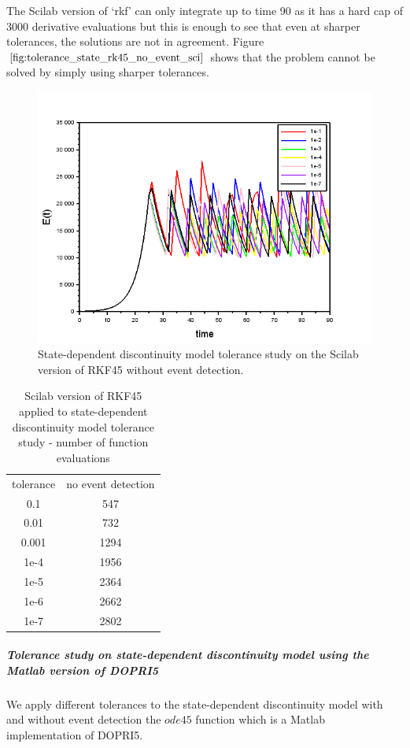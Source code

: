 The Scilab version of `rkf' can only integrate up to time 90 as it has a hard cap of 3000 derivative evaluations but this is enough to see that even at sharper tolerances, the solutions are not in agreement. Figure $\ref{fig:tolerance_state_rk45_no_event_sci}$ shows that the problem cannot be solved by simply using sharper tolerances. 
\begin{figure}[h]
\centering
\includegraphics[width=0.7\linewidth]{./figures/tolerance_state_rk45_no_event_sci}
\caption{State-dependent discontinuity model tolerance study on the Scilab version of RKF45 without event detection.}
\label{fig:tolerance_state_rk45_no_event_sci}
\end{figure}

\begin{table}[h]
\caption {Scilab version of RKF45 applied to state-dependent discontinuity model tolerance study - number of function evaluations} \label{tab:tolerance_state_discontinuity_rk45_scilab} 
\begin{center}
\begin{tabular}{ c c }
tolerance & no event detection \\ 
0.1 & 547 \\
0.01 & 732 \\
0.001 & 1294 \\
1e-4 & 1956 \\
1e-5 & 2364 \\
1e-6 & 2662 \\
1e-7 & 2802 \\
\end{tabular}
\end{center}
\end{table}

\subparagraph{Tolerance study on state-dependent discontinuity model using the Matlab version of DOPRI5}
We apply different tolerances to the state-dependent discontinuity model with and without event detection the $ode45$ function which is a Matlab implementation of DOPRI5.

